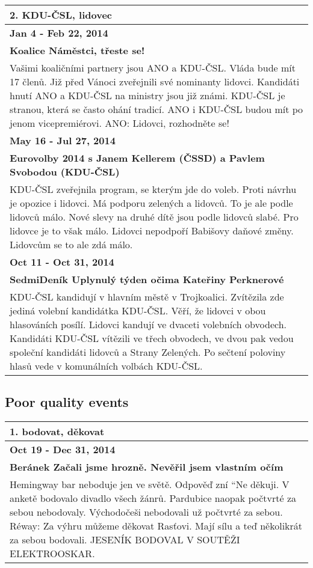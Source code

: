 \begin{tabularx}{\linewidth}{p{\linewidth}} \toprule[1.5pt]
\bf 2. KDU-ČSL, lidovec \\ \midrule
\bf Jan 4 - Feb 22, 2014 \\ \midrule
\bf Koalice Náměstci, třeste se! \\
Vašimi koaličními partnery jsou ANO a KDU-ČSL. Vláda bude mít 17 členů. Již před Vánoci zveřejnili své nominanty lidovci. Kandidáti hnutí ANO a KDU-ČSL na ministry jsou již známi. KDU-ČSL je stranou, která se často ohání tradicí. ANO i KDU-ČSL budou mít po jenom vicepremiérovi. ANO: Lidovci, rozhodněte se! \\ \bottomrule[1.25pt]

\bf May 16 - Jul 27, 2014 \\ \midrule
\bf Eurovolby 2014 s Janem Kellerem (ČSSD) a Pavlem Svobodou (KDU-ČSL) \\
KDU-ČSL zveřejnila program, se kterým jde do voleb. Proti návrhu je opozice i lidovci. Má podporu zelených a lidovců. To je ale podle lidovců málo. Nové slevy na druhé dítě jsou podle lidovců slabé. Pro lidovce je to však málo. Lidovci nepodpoří Babišovy daňové změny. Lidovcům se to ale zdá málo. \\ \bottomrule[1.25pt]

\bf Oct 11 - Oct 31, 2014 \\ \midrule
\bf SedmiDeník Uplynulý týden očima Kateřiny Perknerové \\
KDU-ČSL kandidují v hlavním městě v Trojkoalici. Zvítězila zde jediná volební kandidátka KDU-ČSL. Věří, že lidovci v obou hlasováních posílí. Lidovci kandují ve dvaceti volebních obvodech. Kandidáti KDU-ČSL vítězili ve třech obvodech, ve dvou pak vedou společní kandidáti lidovců a Strany Zelených. Po sečtení poloviny hlasů vede v komunálních volbách KDU-ČSL. \\ \bottomrule[1.25pt]

\end{tabularx}

\hspace{\fill}

\subsection*{Poor quality events}
\begin{tabularx}{\linewidth}{p{\linewidth}} \toprule[1.5pt]

\bf 1. bodovat, děkovat \\ \midrule
\bf Oct 19 - Dec 31, 2014 \\ \midrule
\bf Beránek Začali jsme hrozně. Nevěřil jsem vlastním očím \\
Hemingway bar neboduje jen ve světě. Odpověď zní ``Ne děkuji. V anketě bodovalo divadlo všech žánrů. Pardubice naopak počtvrté za sebou nebodovaly. Východočeši nebodovali už počtvrté za sebou. Réway: Za výhru můžeme děkovat Rasťovi. Mají sílu a teď několikrát za sebou bodovali. JESENÍK BODOVAL V SOUTĚŽI ELEKTROOSKAR. \\ \bottomrule[1.25pt]
\end{tabularx}

